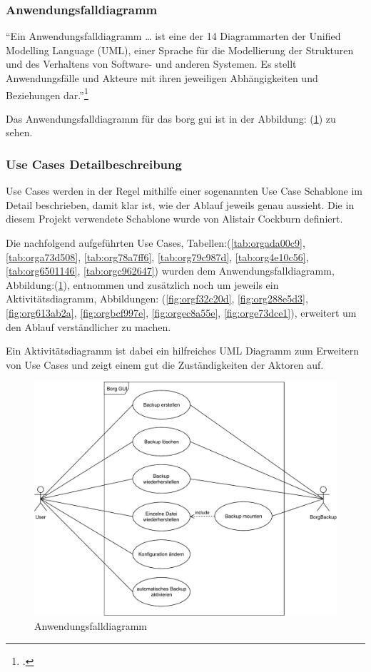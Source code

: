 \subsubsection{Anwendungsfalldiagramm}
\label{sec:org1c2414b}

"`Ein Anwendungsfalldiagramm \ldots{} ist eine der 14 Diagrammarten der
Unified Modelling Language (UML), einer Sprache für die Modellierung
der Strukturen und des Verhaltens von Software- und anderen Systemen.
Es stellt Anwendungsfälle und Akteure mit ihren jeweiligen
Abhängigkeiten und Beziehungen dar."'\footcite{usecasediagramm}

Das Anwendungsfalldiagramm für das \gls{borg} \gls{gui} ist in der Abbildung:
(\ref{fig:org49a405a}) zu sehen.

\subsubsection{Use Cases Detailbeschreibung}
\label{sec:org7eb46b4}

Use Cases werden in der Regel mithilfe einer sogenannten Use Case Schablone im
Detail beschrieben, damit klar ist, wie der Ablauf jeweils genau aussieht. Die
in diesem Projekt verwendete Schablone wurde von Alistair Cockburn definiert.

Die nachfolgend aufgeführten Use Cases, Tabellen:(\ref{tab:orgada00c9}, \ref{tab:orga73d508},
\ref{tab:org78a7ff6}, \ref{tab:org79c987d}, \ref{tab:org4e10c56}, \ref{tab:org6501146}, \ref{tab:orgc962647})
wurden dem Anwendungsfalldiagramm, Abbildung:(\ref{fig:org49a405a}), entnommen und
zusätzlich noch um jeweils ein Aktivitätsdiagramm, Abbildungen:
(\ref{fig:orgf32c20d}, \ref{fig:org288e5d3}, \ref{fig:org613ab2a},
\ref{fig:orgbcf997e}, \ref{fig:orgec8a55e}, \ref{fig:orge73dce1}), erweitert
um den Ablauf verständlicher zu machen.

Ein Aktivitätsdiagramm ist dabei ein hilfreiches UML Diagramm zum Erweitern von
Use Cases und zeigt einem gut die Zuständigkeiten der Aktoren auf.

\begin{landscape}
\begin{figure}[htbp]
\centering
\includegraphics[width=.75\linewidth]{pictures/use_case.pdf}
\caption{\label{fig:org49a405a}
Anwendungsfalldiagramm}
\end{figure}
\afterpage{\blankpage}
\end{landscape}


